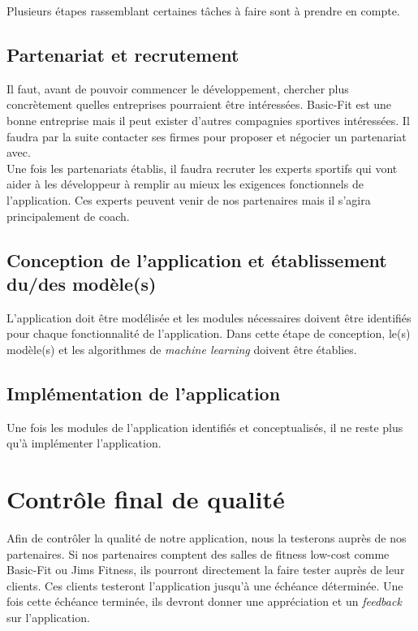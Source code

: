 Plusieurs étapes rassemblant certaines tâches à faire sont à prendre en compte. 

\subsection*{Partenariat et recrutement}

Il faut, avant de pouvoir commencer le développement, chercher plus con\-crè\-te\-ment quelles entreprises pourraient être intéressées. Basic-Fit est une bonne entreprise mais il peut exister d'autres compagnies sportives intéressées. Il faudra par la suite contacter ses firmes pour proposer et négocier un partenariat avec.\\

Une fois les partenariats établis, il faudra recruter les experts sportifs qui vont aider à les développeur à remplir au mieux les exigences fonctionnels de l'application. Ces experts peuvent venir de nos partenaires mais il s'agira principalement de coach. 

\subsection*{Conception de l'application et établissement du/des modèle(s)}

L'application doit être modélisée et les modules nécessaires doivent être identifiés pour chaque fonctionnalité de l'application. Dans cette étape de conception, le(s) modèle(s) et les algorithmes de \textit{machine learning} doivent être établies. 

\subsection*{Implémentation de l'application}

Une fois les modules de l'application identifiés et conceptualisés, il ne reste plus qu'à implémenter l'application. 

\section{Contrôle final de qualité}

Afin de contrôler la qualité de notre application, nous la testerons auprès de nos partenaires. Si nos partenaires comptent des salles de fitness low-cost comme Basic-Fit ou Jims Fitness, ils pourront directement la faire tester auprès de leur clients. Ces clients testeront l'application jusqu'à une échéance déterminée. Une fois cette échéance terminée, ils devront donner une appréciation et un \textit{feedback} sur l'application.\\

